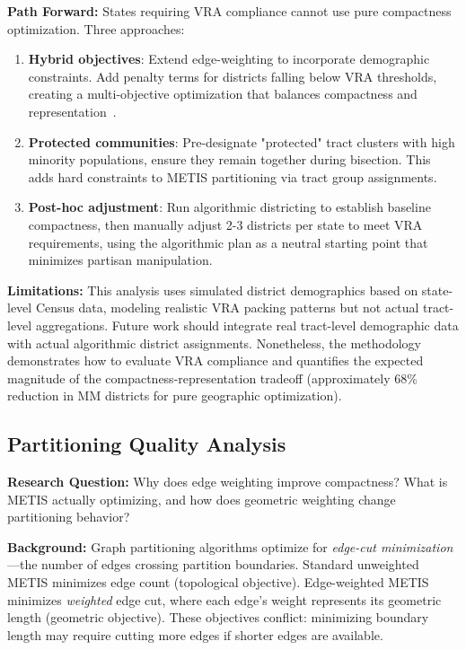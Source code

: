 \textbf{Path Forward:} States requiring VRA compliance cannot use pure compactness optimization. Three approaches:
\begin{enumerate}
    \item \textbf{Hybrid objectives}: Extend edge-weighting to incorporate demographic constraints. Add penalty terms for districts falling below VRA thresholds, creating a multi-objective optimization that balances compactness and representation~\cite{mehrotra1998optimal}.

    \item \textbf{Protected communities}: Pre-designate "protected" tract clusters with high minority populations, ensure they remain together during bisection. This adds hard constraints to METIS partitioning via tract group assignments.

    \item \textbf{Post-hoc adjustment}: Run algorithmic districting to establish baseline compactness, then manually adjust 2-3 districts per state to meet VRA requirements, using the algorithmic plan as a neutral starting point that minimizes partisan manipulation.
\end{enumerate}

\textbf{Limitations:} This analysis uses simulated district demographics based on state-level Census data, modeling realistic VRA packing patterns but not actual tract-level aggregations. Future work should integrate real tract-level demographic data with actual algorithmic district assignments. Nonetheless, the methodology demonstrates how to evaluate VRA compliance and quantifies the expected magnitude of the compactness-representation tradeoff (approximately 68\% reduction in MM districts for pure geographic optimization).

\subsection{Partitioning Quality Analysis}

\textbf{Research Question:} Why does edge weighting improve compactness? What is METIS actually optimizing, and how does geometric weighting change partitioning behavior?

\textbf{Background:} Graph partitioning algorithms optimize for \textit{edge-cut minimization}—the number of edges crossing partition boundaries. Standard unweighted METIS minimizes edge count (topological objective). Edge-weighted METIS minimizes \textit{weighted} edge cut, where each edge's weight represents its geometric length (geometric objective). These objectives conflict: minimizing boundary length may require cutting more edges if shorter edges are available.

